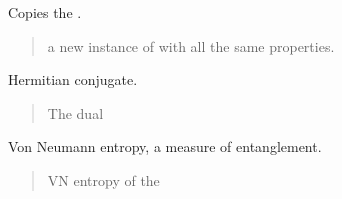 \documentclass[letterpaper,10pt,english]{sphinxmanual}
\begin{document}
\begin{fulllineitems}
\begin{fulllineitems}
\label{\detokenize{spinbox:spinbox.core.HilbertState.copy}}
\pysigstartsignatures
{}
\pysigstopsignatures
\sphinxAtStartPar
Copies the .
\begin{quote}\begin{description}
\sphinxAtStartPar
a new instance of  with all the same properties.

\sphinxAtStartPar
{\hyperref[\detokenize{spinbox:spinbox.core.HilbertState}]{}}

\end{description}\end{quote}

\end{fulllineitems}


\begin{fulllineitems}
\label{\detokenize{spinbox:spinbox.core.HilbertState.dagger}}
\pysigstartsignatures
{}
\pysigstopsignatures
\sphinxAtStartPar
Hermitian conjugate.
\begin{quote}\begin{description}
\sphinxAtStartPar
The dual 

\sphinxAtStartPar
{\hyperref[\detokenize{spinbox:spinbox.core.HilbertState}]{}}

\end{description}\end{quote}

\end{fulllineitems}


\begin{fulllineitems}
\label{\detokenize{spinbox:spinbox.core.HilbertState.entropy}}
\pysigstartsignatures
{}
\pysigstopsignatures
\sphinxAtStartPar
Von Neumann entropy, a measure of entanglement.
\begin{quote}\begin{description}
\sphinxAtStartPar
VN entropy of the 


\end{description}
\end{quote}
\end{fulllineitems}
\end{fulllineitems}
\end{document}
